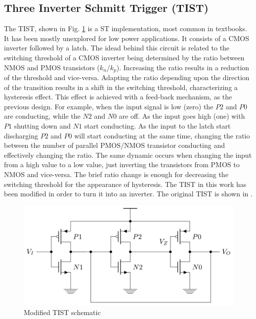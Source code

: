 \documentclass[pgmicro,mestrado,english]{iiufrgs}
\begin{document}
\subsection{Three Inverter Schmitt Trigger (TIST)}

The TIST, shown in Fig. \ref{fig:TIST} is a ST implementation, most common in textbooks. It has been mostly unexplored for low power applications. It consists of a CMOS inverter followed by a latch. The idead behind this circuit is related to the switching threshold of a CMOS inverter being determined by the ratio between NMOS and PMOS transistors ($k_n$/$k_p$). Increasing the ratio results in a reduction of the threshold and vice-versa. Adapting the ratio depending upon the direction of the transition results in a shift in the switching threshold, characterizing a hysteresis effect. This effect is achieved with a feed-back mechanism, as the previous design. For example, when the input signal is low (zero) the $P2$ and $P0$ are conducting, while the $N2$ and $N0$ are off. As the input goes high (one) with $P1$ shutting down and $N1$ start conducting. As the input to the latch start discharging $P2$ and $P0$ will start conducting at the same time, changing the ratio between the number of parallel PMOS/NMOS transistor conducting and effectively changing the ratio. The same dynamic occurs when changing the input from a high value to a low value, just inverting the transistors from PMOS to NMOS and vice-versa. The brief ratio change is enough for decreasing the switching threshold for the appearance of hysteresis. The TIST in this work has been modified in order to turn it into an inverter. The original TIST is shown in \cite{rabaey2002digital}.

\begin{figure}[]
  \centering
    \includegraphics[width=1\textwidth]{TIST.png}
     \caption{Modified TIST schematic \cite{rabaey2002digital}}
  \label{fig:TIST}
\end{figure}
\end{document}
